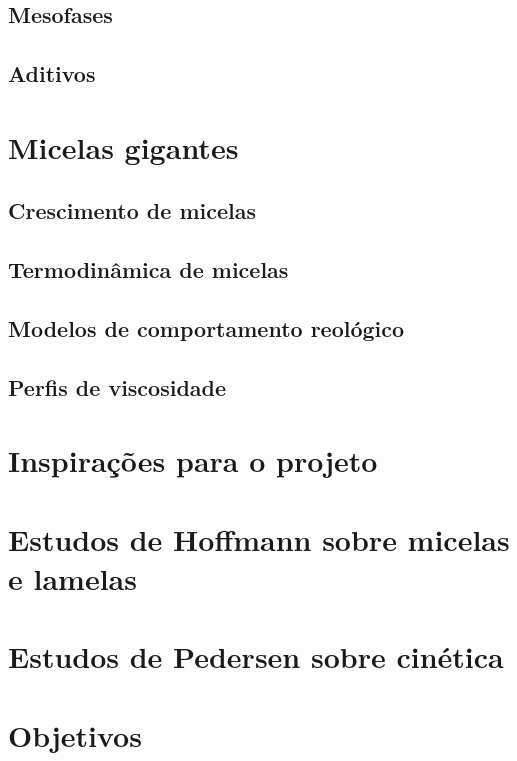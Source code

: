 		\section{Mesofases}
		\section{Aditivos}
	\chapter{Micelas gigantes}
		\section{Crescimento de micelas}
		\section{Termodinâmica de micelas}
		\section{Modelos de comportamento reológico}
		\section{Perfis de viscosidade}
	\chapter{Inspirações para o projeto}
		\chapter{Estudos de Hoffmann sobre micelas e lamelas}
		\chapter{Estudos de Pedersen sobre cinética}
	\chapter{Objetivos}
